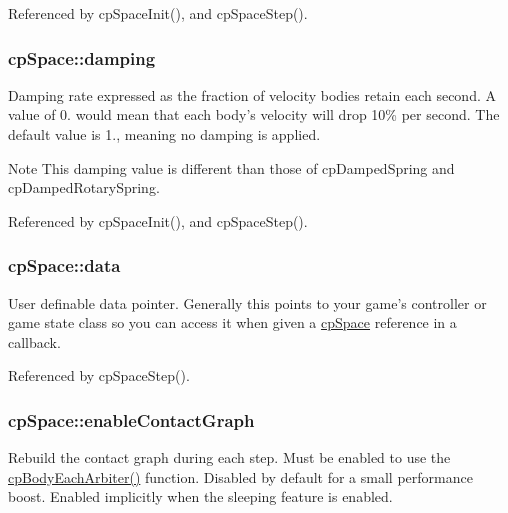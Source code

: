 Referenced by cp\-Space\-Init(), and cp\-Space\-Step().

\hypertarget{structcp_space_a421f86b111318e2eced602c6930fffaa}{
\subsubsection[{damping}]{ {\bf cp\-Space\-::damping}}}\label{structcp_space_a421f86b111318e2eced602c6930fffaa}
Damping rate expressed as the fraction of velocity bodies retain each second. A value of 0. would mean that each body's velocity will drop 10\% per second. The default value is 1., meaning no damping is applied. \begin{DoxyNote}{Note}
This damping value is different than those of cp\-Damped\-Spring and cp\-Damped\-Rotary\-Spring. 
\end{DoxyNote}


Referenced by cp\-Space\-Init(), and cp\-Space\-Step().

\hypertarget{structcp_space_a9c4c3792e422dd353a49b8657f102f33}{
\subsubsection[{data}]{ {\bf cp\-Space\-::data}}}\label{structcp_space_a9c4c3792e422dd353a49b8657f102f33}
User definable data pointer. Generally this points to your game's controller or game state class so you can access it when given a \hyperlink{structcp_space}{cp\-Space} reference in a callback. 

Referenced by cp\-Space\-Step().

\hypertarget{structcp_space_ac4f67b1946aad96a50299ac769d781bb}{
\subsubsection[{enable\-Contact\-Graph}]{ {\bf cp\-Space\-::enable\-Contact\-Graph}}}\label{structcp_space_ac4f67b1946aad96a50299ac769d781bb}
Rebuild the contact graph during each step. Must be enabled to use the \hyperlink{group__cp_body_gacc958b3adad795e718682bea830d4135}{cp\-Body\-Each\-Arbiter()} function. Disabled by default for a small performance boost. Enabled implicitly when the sleeping feature is enabled. 

